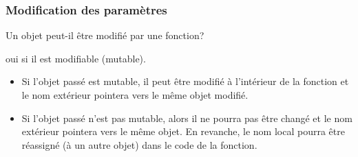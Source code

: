 \begin{frame}
  \frametitle{Modification des paramètres}
Un objet peut-il être modifié par une fonction?

oui si il est modifiable (mutable).\newline
\begin{itemize}
  \item Si l'objet passé est mutable, il peut être modifié à l'intérieur de la fonction et le nom extérieur pointera vers le même objet modifié.
  \item Si l'objet passé n'est pas mutable, alors il ne pourra pas être changé et le nom extérieur pointera vers le même objet. En revanche, le nom local pourra être réassigné (à un autre objet) dans le code de la fonction. 

\end{itemize}
\end{frame}


